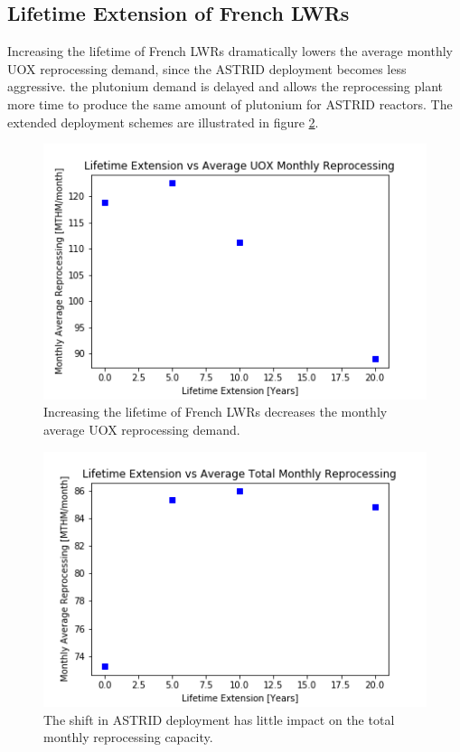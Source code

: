 \subsection{Lifetime Extension of French \glspl{LWR}}
Increasing the lifetime of French \glspl{LWR} dramatically lowers the average
monthly \gls{UOX} reprocessing demand, since the \gls{ASTRID} deployment becomes less
aggressive. the plutonium demand is delayed and allows the reprocessing plant more
time to produce the same amount of plutonium for \gls{ASTRID} reactors. The
extended deployment schemes are illustrated in figure \ref{fig:ext}. 

\begin{figure}[htbp!]
    \begin{center}
        \includegraphics[scale=0.6]{./images/sensitivity/ext_uox.png}
    \end{center}
    \caption{Increasing the lifetime of French \glspl{LWR} decreases the monthly
             average \gls{UOX} reprocessing demand.}
    \label{fig:ext}
\end{figure}


\begin{figure}[htbp!]
    \begin{center}
        \includegraphics[scale=0.6]{./images/sensitivity/ext_all.png}
    \end{center}
    \caption{The shift in \gls{ASTRID} deployment has little impact on the total monthly
             reprocessing capacity.}
    \label{fig:ext}
\end{figure}


